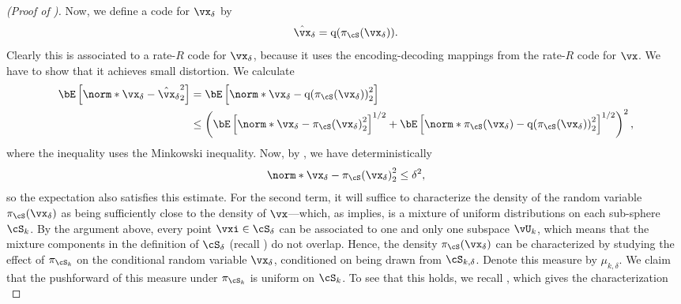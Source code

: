 \documentclass[../../book-main.tex]{subfiles}
\begin{document}
\begin{proof}[(Proof of )]
    Now, we define a code for $\vx_{\delta}$ by
    \begin{equation}
        \hat{\vx}_{\delta} = \mathrm{q}( \pi_{\cS}(\vx_{\delta}) ).
    \end{equation}
    Clearly this is associated to a rate-$R$ code for $\vx_{\delta}$, because it
    uses the encoding-decoding mappings from the rate-$R$ code for $\vx$. We
    have to show that it achieves small distortion.
    We calculate
    \begin{align}
        \bE\left[ \norm*{ \vx_{\delta} - \hat{\vx}_{\delta} }_2^2 \right]
        &=
        \bE\left[ \norm*{ \vx_{\delta} -
        \mathrm{q}(\pi_{\cS}(\vx_{\delta})) }_2^2 \right]
        \\
        &\leq
        \left(
            \bE\left[ \norm*{ \vx_{\delta} - \pi_{\cS}(\vx_{\delta}) }_2^2
            \right]^{1/2}
            + \bE\left[ \norm*{ \pi_{\cS}(\vx_{\delta})
            - \mathrm{q}(\pi_{\cS}(\vx_{\delta})) }_2^2 \right]^{1/2}
        \right)^2,\label{eq:distortion-decomposition}
    \end{align}
    where the inequality uses the Minkowski inequality.
    Now, by , we have
    deterministically
    \begin{equation}
        \norm*{ \vx_{\delta} - \pi_{\cS}(\vx_{\delta}) }_2^2
        \leq \delta^2,
    \end{equation}
    so the expectation also satisfies this estimate.
    For the second term, it will suffice to characterize the density of the
    random variable $\pi_{\cS}(\vx_{\delta})$ as being sufficiently close to the
    density of $\vx$---which, as  implies, is
    a mixture of uniform distributions on each sub-sphere $\cS_k$.
    By the argument above, every point $\vxi \in \cS_{\delta}$ can be associated
    to one and only one subspace $\vU_k$, which means that the mixture
    components in the definition of $\cS_{\delta}$ (recall
    ) do not overlap. Hence, the density
    $\pi_{\cS}(\vx_{\delta})$ can be characterized by studying the effect of
    $\pi_{\cS_k}$ on the conditional random variable $\vx_{\delta}$, conditioned
    on being drawn from $\cS_{k, \delta}$. Denote this measure by $\mu_{k,
    \delta}$.
    We claim that the pushforward of this measure under $\pi_{\cS_k}$
    is uniform on $\cS_k$.
    To see that this holds, we recall
    ,
    which gives the characterization
    \begin{equation}

\end{equation}
\end{proof}
\end{document}
